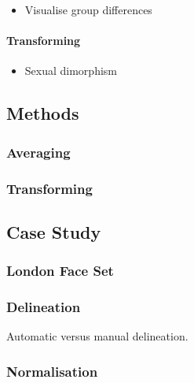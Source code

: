 \documentclass[
  english,
  man]{apa6}
\providecommand{\tightlist}{%
  \setlength{\itemsep}{0pt}\setlength{\parskip}{0pt}}
\let\oldparagraph\paragraph
\renewcommand{\paragraph}[1]{\oldparagraph{#1}\mbox{}}
\begin{document}
\begin{itemize}
\tightlist
\item
  Visualise group differences
\end{itemize}

\hypertarget{transforming}{%
\paragraph{Transforming}\label{transforming}}

\begin{itemize}
\tightlist
\item
  Sexual dimorphism
\end{itemize}

\hypertarget{methods}{%
\subsection{Methods}\label{methods}}

\hypertarget{averaging-1}{%
\subsubsection{Averaging}\label{averaging-1}}

\hypertarget{transforming-1}{%
\subsubsection{Transforming}\label{transforming-1}}

\hypertarget{case-study}{%
\subsection{Case Study}\label{case-study}}

\hypertarget{london-face-set}{%
\subsubsection{London Face Set}\label{london-face-set}}

\hypertarget{delineation}{%
\subsubsection{Delineation}\label{delineation}}

Automatic versus manual delineation.

\hypertarget{normalisation}{%
\subsubsection{Normalisation}\label{normalisation}}
\end{document}
